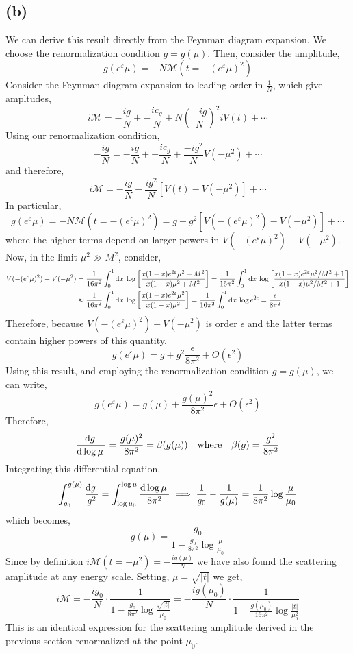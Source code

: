 \documentclass[12pt]{article}
\begin{document}
\subsection*{(b)}
We can derive this result directly from the Feynman diagram expansion. We choose the renormalization condition $g = g(\mu)$. Then, consider the amplitude, 
\[g(e^\varepsilon \mu) = -N \mathcal{M}(t = -(e^\varepsilon \mu)^2) \]
Consider the Feynman diagram expansion to leading order in $\frac{1}{N}$, 
which give ampltudes,
\[ i\mathcal{M} = -\frac{ig}{N} + -\frac{ic_g}{N} + N \left(\frac{-ig}{N}\right)^2 iV(t) + \cdots \] 
Using our renormalization condition,
\[ -\frac{ig}{N} = -\frac{ig}{N} + -\frac{ic_g}{N} + \frac{-i g^2}{N} V(-\mu^2) + \cdots \]
and therefore,
\[ i\mathcal{M} = -\frac{ig}{N} - \frac{i g^2}{N} [V(t) - V(-\mu^2)] + \cdots \] 
In particular,
\[ g(e^\varepsilon \mu) = - N \mathcal{M}(t = - (e^\epsilon \mu)^2) = g + g^2 [V(-(e^\varepsilon \mu)^2) - V(-\mu^2)] + \cdots \] 
where the higher terms depend on larger powers in $V(-(e^\varepsilon \mu)^2) - V(-\mu^2)$. 
Now, in the limit $\mu^2 \gg M^2$, consider,
\begin{align*}
V(-(e^\varepsilon \mu)^2) - V(-\mu^2) & = \frac{1}{16\pi^2} \int_0^1 \mathrm{d}x \: \log{\left[ \frac{x(1-x) e^{2\varepsilon} \mu^2 + M^2}{x(1-x)\mu^2 + M^2} \right]} = \frac{1}{16\pi^2} \int_0^1 \mathrm{d}x \: \log{\left[ \frac{x(1-x) e^{2\varepsilon} \mu^2/M^2 + 1}{x(1-x)\mu^2/M^2 + 1} \right]} 
\\
& \approx
\frac{1}{16\pi^2} \int_0^1 \mathrm{d}x \: \log{\left[ \frac{x(1-x) e^{2\varepsilon} \mu^2}{x(1-x)\mu^2} \right]} = \frac{1}{16 \pi^2} \int_0^1 \mathrm{d}x \: \log{e^{2 \epsilon}} = \frac{\epsilon}{8 \pi^2} 
\end{align*}
Therefore, because $V(-(e^\varepsilon \mu)^2) - V(-\mu^2)$ is order $\epsilon$ and the latter terms contain higher powers of this quantity,
\[ g(e^\varepsilon \mu) = g + g^2 \frac{\epsilon}{8 \pi^2} + O(\epsilon^2) \] 
Using this result, and employing the renormalization condition $g = g(\mu)$, we can write,
\[ g(e^\varepsilon \mu) = g(\mu) + \frac{g(\mu)^2}{8 \pi^2} \epsilon + O(\epsilon^2) \] 
Therefore,
\[ \frac{\mathrm{d}g \:}{\mathrm{d}\log{\mu} \:} = \frac{g(\mu)^2}{8 \pi^2} = \beta(g(\mu)) \quad \text{where} \quad \beta(g) = \frac{g^2}{8 \pi^2} \]
Integrating this differential equation,
\[ \int_{g_0}^{g(\mu)} \frac{\mathrm{d}g \:}{g^2} = \int_{\log{\mu_0}}^{\log{\mu}} \frac{\mathrm{d}\log{\mu} \:}{8 \pi^2} \implies \frac{1}{g_0} - \frac{1}{g(\mu)} = \frac{1}{8 \pi^2} \log{\frac{\mu}{\mu_0}} \]
which becomes,
\[ g(\mu) = \frac{g_0}{1 - \frac{g_0}{8\pi^2} \log{\frac{\mu}{\mu_0}}} \]
Since by definition $i \mathcal{M}(t = - \mu^2) = -\frac{ig(\mu)}{N}$ we have also found the scattering amplitude at any energy scale. Setting, $\mu = \sqrt{|t|}$ we get,
\[ i \mathcal{M} = - \frac{ig_0}{N} \cdot \frac{1}{1 - \frac{g_0}{8 \pi^2} \log{\frac{\sqrt{|t|}}{\mu_0}}} = - \frac{ig(\mu_0)}{N} \cdot \frac{1}{1 - \frac{g(\mu_0)}{16 \pi^2} \log{\frac{|t|}{\mu_0^2}}} \]
This is an identical expression for the scattering amplitude derived in the previous section renormalized at the point $\mu_0$.
\end{document}
